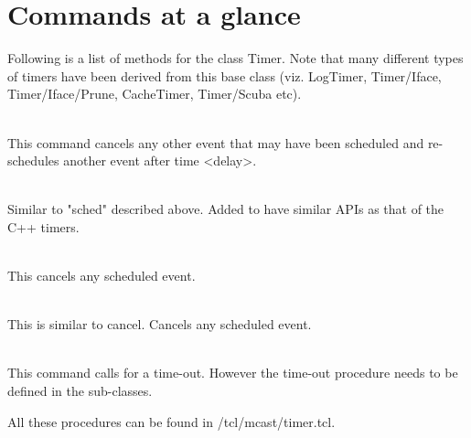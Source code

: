 \section{Commands at a glance}
\label{sec:timercommand}

Following is a list of methods for the class Timer. Note that many
different types of timers have been derived from this base class (viz.
LogTimer, Timer/Iface, Timer/Iface/Prune, CacheTimer, Timer/Scuba etc).
\begin{flushleft}
\\
This command cancels any other event that may have been scheduled and re-schedules
another event after time <delay>.


\\
Similar to "sched" described above. Added to have similar APIs as that of the
C++ timers.


\\
This cancels any scheduled event.


\\
This is similar to cancel. Cancels any scheduled event.


\\
This command calls for a time-out. However the time-out procedure needs to be
defined in the sub-classes.


All these procedures can be found in \ns/tcl/mcast/timer.tcl.
\end{flushleft}
\endinput
